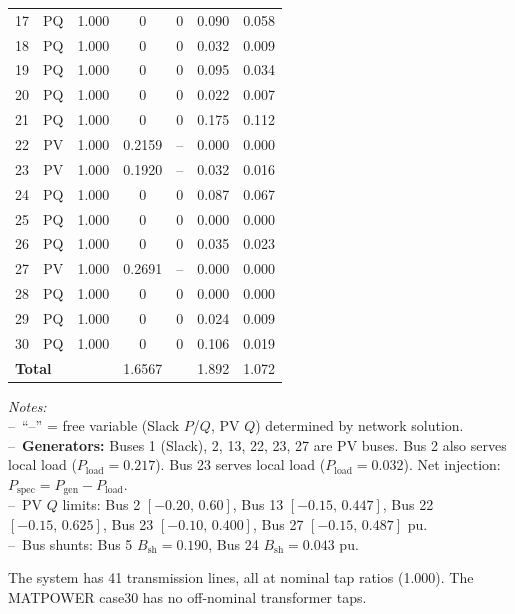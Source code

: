 \documentclass[12pt,a4paper]{article}
\begin{document}
\begin{table}[H]
\begin{tabular}{ccccccc}
17 & PQ    & 1.000 & 0     & 0   & 0.090 & 0.058 \\
18 & PQ    & 1.000 & 0     & 0   & 0.032 & 0.009 \\
19 & PQ    & 1.000 & 0     & 0   & 0.095 & 0.034 \\
20 & PQ    & 1.000 & 0     & 0   & 0.022 & 0.007 \\
21 & PQ    & 1.000 & 0     & 0   & 0.175 & 0.112 \\
22 & PV    & 1.000 & 0.2159 & -- & 0.000 & 0.000 \\
23 & PV    & 1.000 & 0.1920 & -- & 0.032 & 0.016 \\
24 & PQ    & 1.000 & 0     & 0   & 0.087 & 0.067 \\
25 & PQ    & 1.000 & 0     & 0   & 0.000 & 0.000 \\
26 & PQ    & 1.000 & 0     & 0   & 0.035 & 0.023 \\
27 & PV    & 1.000 & 0.2691 & -- & 0.000 & 0.000 \\
28 & PQ    & 1.000 & 0     & 0   & 0.000 & 0.000 \\
29 & PQ    & 1.000 & 0     & 0   & 0.024 & 0.009 \\
30 & PQ    & 1.000 & 0     & 0   & 0.106 & 0.019 \\
\midrule
\multicolumn{2}{l}{\textbf{Total}} & & 1.6567 & & 1.892 & 1.072 \\
\bottomrule
\end{tabular}
\end{table}

\begin{flushleft}
\footnotesize
\textit{Notes:}\\[2pt]
--\ ``--'' = free variable (Slack $P$/$Q$, PV $Q$) determined by network solution.\\[2pt]
--\ \textbf{Generators:} Buses 1 (Slack), 2, 13, 22, 23, 27 are PV buses. Bus 2 also serves local load ($P_{\text{load}}=0.217$). Bus 23 serves local load ($P_{\text{load}}=0.032$). Net injection: $P_{\text{spec}} = P_{\text{gen}} - P_{\text{load}}$.\\[2pt]
--\ PV $Q$ limits: Bus 2 $[-0.20,\,0.60]$, Bus 13 $[-0.15,\,0.447]$, Bus 22 $[-0.15,\,0.625]$, Bus 23 $[-0.10,\,0.400]$, Bus 27 $[-0.15,\,0.487]$ pu.\\[2pt]
--\ Bus shunts: Bus 5 $B_{\text{sh}}=0.190$, Bus 24 $B_{\text{sh}}=0.043$ pu.
\end{flushleft}

The system has 41 transmission lines, all at nominal tap ratios (1.000). The MATPOWER case30 has no off-nominal transformer taps.
\end{document}
